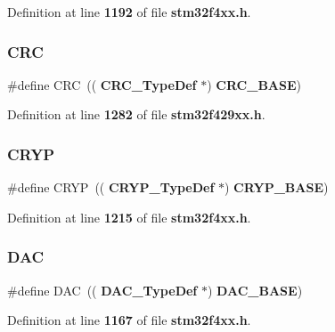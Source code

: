 Definition at line \textbf{ 1192} of file \textbf{ stm32f4xx.\+h}.

\mbox{\label{group__Peripheral__declaration_ga4381bb54c2dbc34500521165aa7b89b1}} 
\subsubsection{C\+RC\hspace{0.1cm}{\footnotesize\ttfamily [2/2]}}
{\footnotesize\ttfamily \#define C\+RC~((\textbf{ C\+R\+C\+\_\+\+Type\+Def} $\ast$) \textbf{ C\+R\+C\+\_\+\+B\+A\+SE})}



Definition at line \textbf{ 1282} of file \textbf{ stm32f429xx.\+h}.

\mbox{\label{group__Peripheral__declaration_gaf8c417168aefe66429b5f1b6adc9effa}} 
\subsubsection{C\+R\+YP}
{\footnotesize\ttfamily \#define C\+R\+YP~((\textbf{ C\+R\+Y\+P\+\_\+\+Type\+Def} $\ast$) \textbf{ C\+R\+Y\+P\+\_\+\+B\+A\+SE})}



Definition at line \textbf{ 1215} of file \textbf{ stm32f4xx.\+h}.

\mbox{\label{group__Peripheral__declaration_ga4aa2a4ab86ce00c23035e5cee2e7fc7e}} 
\subsubsection{D\+AC\hspace{0.1cm}{\footnotesize\ttfamily [1/2]}}
{\footnotesize\ttfamily \#define D\+AC~((\textbf{ D\+A\+C\+\_\+\+Type\+Def} $\ast$) \textbf{ D\+A\+C\+\_\+\+B\+A\+SE})}



Definition at line \textbf{ 1167} of file \textbf{ stm32f4xx.\+h}.

\mbox{\label{group__Peripheral__declaration_ga4aa2a4ab86ce00c23035e5cee2e7fc7e}} 
